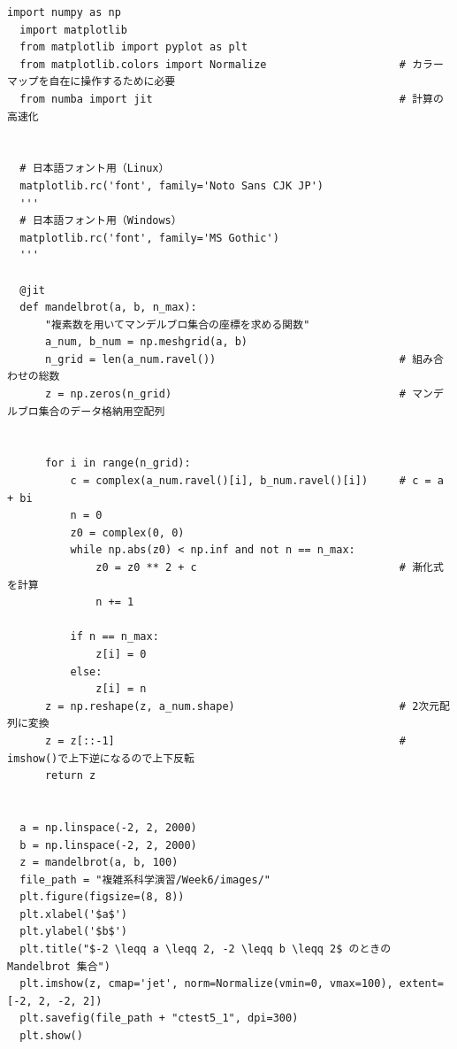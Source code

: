 \begin{lstlisting}[caption=mandelbrot.py]
  import numpy as np
  import matplotlib
  from matplotlib import pyplot as plt
  from matplotlib.colors import Normalize                     # カラーマップを自在に操作するために必要
  from numba import jit                                       # 計算の高速化


  # 日本語フォント用（Linux）
  matplotlib.rc('font', family='Noto Sans CJK JP')
  '''
  # 日本語フォント用（Windows）
  matplotlib.rc('font', family='MS Gothic')
  '''

  @jit
  def mandelbrot(a, b, n_max):
      "複素数を用いてマンデルブロ集合の座標を求める関数"
      a_num, b_num = np.meshgrid(a, b)
      n_grid = len(a_num.ravel())                             # 組み合わせの総数
      z = np.zeros(n_grid)                                    # マンデルブロ集合のデータ格納用空配列


      for i in range(n_grid):
          c = complex(a_num.ravel()[i], b_num.ravel()[i])     # c = a + bi
          n = 0
          z0 = complex(0, 0)
          while np.abs(z0) < np.inf and not n == n_max:
              z0 = z0 ** 2 + c                                # 漸化式を計算
              n += 1
          
          if n == n_max:
              z[i] = 0
          else:
              z[i] = n
      z = np.reshape(z, a_num.shape)                          # 2次元配列に変換
      z = z[::-1]                                             # imshow()で上下逆になるので上下反転
      return z


  a = np.linspace(-2, 2, 2000)
  b = np.linspace(-2, 2, 2000)
  z = mandelbrot(a, b, 100)
  file_path = "複雑系科学演習/Week6/images/"
  plt.figure(figsize=(8, 8))
  plt.xlabel('$a$')
  plt.ylabel('$b$')
  plt.title("$-2 \leqq a \leqq 2, -2 \leqq b \leqq 2$ のときの Mandelbrot 集合")
  plt.imshow(z, cmap='jet', norm=Normalize(vmin=0, vmax=100), extent=[-2, 2, -2, 2])
  plt.savefig(file_path + "ctest5_1", dpi=300)
  plt.show()
\end{lstlisting}

\newpage
